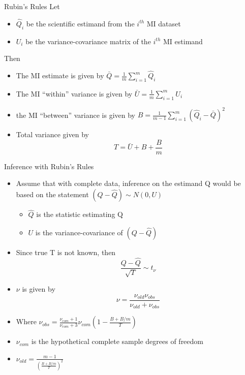 \begin{frame}{Rubin's Rules}
 Let
 \begin{itemize}
  \item $\hat{Q}_i$ be the scientific estimand from the $i^{th}$ MI dataset
  \item $U_i$ be the variance-covariance matrix of the $i^{th}$ MI estimand
 \end{itemize}
Then
\begin{itemize}
 \item The MI estimate is given by
 $\bar{Q}=\frac{1}{m}\sum_{i=1}^{m}\hat{Q}_i$
 \item The MI ``within'' variance is given by
 $\bar{U}=\frac{1}{m}\sum_{i=1}^{m}U_i$
 \item the MI ``between'' variance is given by
 $B=\frac{1}{m-1}\sum_{i=1}^{m}(\hat{Q}_i - \bar{Q})^{2}$ %
   \item Total variance given by \cite{Rubin1987}
  $$T=\bar{U}+B +\frac{B}{m}$$
\end{itemize}

\end{frame}

\begin{frame}{Inference with Rubin's Rules}
 \begin{itemize}
  \item Assume that with complete data, inference on the estimand
  Q would be based on the statement $(Q- \hat{Q})\sim N(0,U)$
  \begin{itemize}
   \item $\hat{Q}$ is the statistic estimating Q
   \item $U$ is the variance-covariance of $(Q-\hat{Q})$
  \end{itemize}
   \item Since true T is not known, then
  $$\frac{Q-\hat{Q}}{\sqrt{T}}\sim t_{\nu}$$
  \item $\nu$ is given by \cite{Barnard1999}
  $$\nu=\frac{\nu_{old}\nu_{obs}}{\nu_{old}+\nu_{obs}}$$
\item Where $\nu_{obs}=\frac{\nu_{com}+1}{\nu_{com}+3}\nu_{com}(1-\frac{B + B/m}{T})$
\item $\nu_{com}$ is the hypothetical complete sample degrees of freedom
\item $\nu_{old}=\frac{m-1}{(\frac{B + B/m}{T})^2}$ 
 \end{itemize}

\end{frame}


